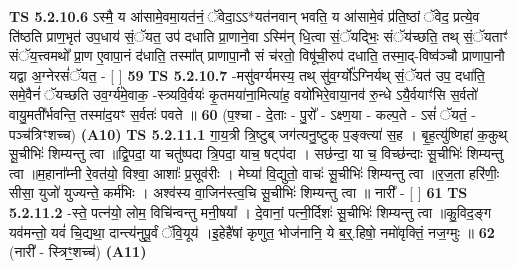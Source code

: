 \documentclass[17pt]{extarticle}
\begin{document}
                  \newline
                                \textbf{ TS 5.2.10.6} \newline
                  ऽस्मै॒ य आ॑सामे॒वमा॒यत॑नं॒ ॅवेदा॒ऽऽ*यत॑नवान् भवति॒ य आ॑सामे॒वं प्र॑ति॒ष्ठां ॅवेद॒ प्रत्ये॒व ति॑ष्ठति प्राण॒भृत॑ उप॒धाय॑ सं॒ॅयत॒ उप॑ दधाति प्रा॒णाने॒वा ऽस्मि॑न् धि॒त्वा सं॒ॅयद्भिः॒ संॅय॑च्छति॒ तथ् सं॒ॅयताꣳ॑ संॅय॒त्त्वमथो᳚ प्रा॒ण ए॒वापा॒नं द॑धाति॒ तस्मा᳚त् प्राणापा॒नौ सं च॑रतो॒ विषू॑ची॒रुप॑ दधाति॒ तस्मा॒द्-विष्व॑ञ्चौ प्राणापा॒नौ यद्वा अ॒ग्नेरसं॑ॅयत॒ - [  ] \textbf{  59} \newline
                  \newline
                                \textbf{ TS 5.2.10.7} \newline
                  -मसु॑वर्ग्यमस्य॒ तथ् सु॑व॒र्ग्यो᳚ऽग्निर्यथ् सं॒ॅयत॑ उप॒ दधा॑ति॒ समे॒वैनं॑ ॅयच्छति उव॒र्ग्य॑मे॒वाक॒ -स्त्र्यवि॒र्वयः॑ कृ॒तमया॑ना॒मित्या॑ह॒ वयो॑भिरे॒वाया॒नव॑ रु॒न्धे ऽयै॒र्वयाꣳ॑सि स॒र्वतो॑ वायु॒मती᳚र्भवन्ति॒ तस्मा॑द॒यꣳ स॒र्वतः॑ पवते ॥ \textbf{  60 } \newline
                  \newline
                       (प॒श्चा - दे॒ताः - पु॒रो᳚ - ऽक्ष्ण॒या - कल्प॒ते - ऽसं॑ ॅयतं॒ - पञ्च॑त्रिꣳशच्च)  \textbf{(A10)} \newline \newline
                                        \textbf{ TS 5.2.11.1} \newline
                  गा॒य॒त्री त्रि॒ष्टुब् जग॑त्यनु॒ष्टुक् प॒ङ्क्त्या॑ स॒ह । बृ॒ह॒त्यु॑ष्णिहा॑ क॒कुथ् सू॒चीभिः॑ शिम्यन्तु त्वा ॥द्वि॒पदा॒ या चतु॑ष्पदा त्रि॒पदा॒ याच॒ षट्प॑दा । सछ॑न्दा॒ या च॒ विच्छ॑न्दाः सू॒चीभिः॑ शिम्यन्तु त्वा ॥म॒हाना᳚म्नी रे॒वत॑यो॒ विश्वा॒ आशाः᳚ प्र॒सूव॑रीः । मेघ्या॑ वि॒द्युतो॒ वाचः॑ सू॒चीभिः॑ शिम्यन्तु त्वा ॥र॒ज॒ता हरि॑णीः॒ सीसा॒ युजो॑ युज्यन्ते॒ कर्म॑भिः । अश्व॑स्य वा॒जिन॑स्त्व॒चि सू॒चीभिः॑ शिम्यन्तु त्वा ॥ नारी᳚ - [  ] \textbf{  61} \newline
                  \newline
                                \textbf{ TS 5.2.11.2} \newline
                  -स्ते॒ पत्न॑यो॒ लोम॒ विचि॑न्वन्तु मनी॒षया᳚ । दे॒वानां॒ पत्नी॒र्दिशः॑ सू॒चीभिः॑ शिम्यन्तु त्वा ॥कु॒विद॒ङ्ग यव॑मन्तो॒ यवं॑ चि॒द्यथा॒ दान्त्य॑नुपू॒र्वं ॅवि॒यूय॑ ।इ॒हेहै॑षां कृणुत॒ भोज॑नानि॒ ये ब॒र्॒.हिषो॒ नमो॑वृक्तिं॒ नज॒ग्मुः ॥ \textbf{  62} \newline
                  \newline
                      (नारी᳚ - स्त्रिꣳ॒॒शच्च॑)  \textbf{(A11)} \newline \newline
\end{document}
